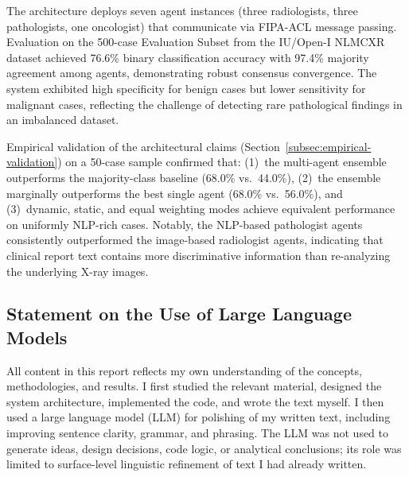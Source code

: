 \documentclass[12pt]{article}
\begin{document}
The architecture deploys seven agent instances (three radiologists, three pathologists, one oncologist) that communicate via FIPA-ACL message passing. Evaluation on the 500-case Evaluation Subset from the IU/Open-I NLMCXR dataset achieved 76.6\% binary classification accuracy with 97.4\% majority agreement among agents, demonstrating robust consensus convergence. The system exhibited high specificity for benign cases but lower sensitivity for malignant cases, reflecting the challenge of detecting rare pathological findings in an imbalanced dataset.

Empirical validation of the architectural claims (Section~\ref{subsec:empirical-validation}) on a 50-case sample confirmed that: (1)~the multi-agent ensemble outperforms the majority-class baseline (68.0\% vs.\ 44.0\%), (2)~the ensemble marginally outperforms the best single agent (68.0\% vs.\ 56.0\%), and (3)~dynamic, static, and equal weighting modes achieve equivalent performance on uniformly NLP-rich cases. Notably, the NLP-based pathologist agents consistently outperformed the image-based radiologist agents, indicating that clinical report text contains more discriminative information than re-analyzing the underlying X-ray images.

\subsection*{Statement on the Use of Large Language Models}

All content in this report reflects my own understanding of the concepts, methodologies, and results. I first studied the relevant material, designed the system architecture, implemented the code, and wrote the text myself. I then used a large language model (LLM) for polishing of my written text, including improving sentence clarity, grammar, and phrasing. The LLM was not used to generate ideas, design decisions, code logic, or analytical conclusions; its role was limited to surface-level linguistic refinement of text I had already written.



\end{document}
